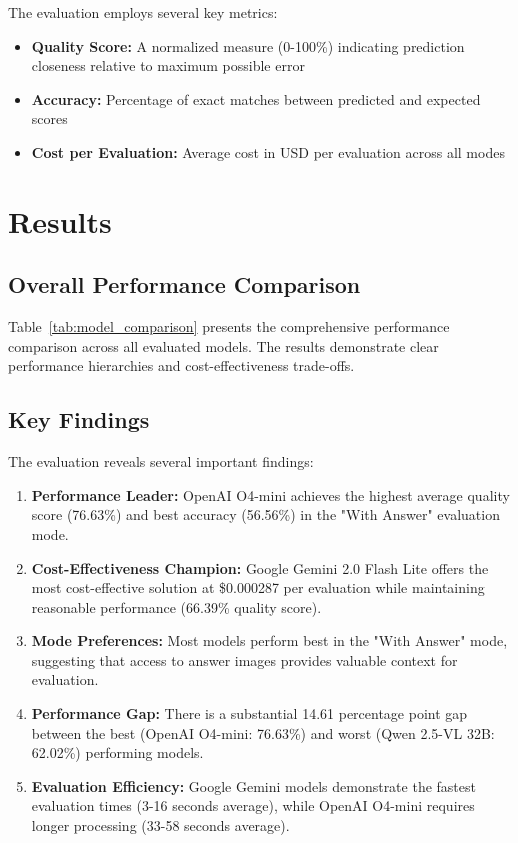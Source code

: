 \documentclass[11pt]{article}
\begin{document}
The evaluation employs several key metrics:

\begin{itemize}
\item \textbf{Quality Score:} A normalized measure (0-100\%) indicating prediction closeness relative to maximum possible error
\item \textbf{Accuracy:} Percentage of exact matches between predicted and expected scores
\item \textbf{Cost per Evaluation:} Average cost in USD per evaluation across all modes
\end{itemize}

\section{Results}

\subsection{Overall Performance Comparison}

Table~\ref{tab:model_comparison} presents the comprehensive performance comparison across all evaluated models. The results demonstrate clear performance hierarchies and cost-effectiveness trade-offs.



\subsection{Key Findings}

The evaluation reveals several important findings:

\begin{enumerate}
\item \textbf{Performance Leader:} OpenAI O4-mini achieves the highest average quality score (76.63\%) and best accuracy (56.56\%) in the "With Answer" evaluation mode.

\item \textbf{Cost-Effectiveness Champion:} Google Gemini 2.0 Flash Lite offers the most cost-effective solution at \$0.000287 per evaluation while maintaining reasonable performance (66.39\% quality score).

\item \textbf{Mode Preferences:} Most models perform best in the "With Answer" mode, suggesting that access to answer images provides valuable context for evaluation.

\item \textbf{Performance Gap:} There is a substantial 14.61 percentage point gap between the best (OpenAI O4-mini: 76.63\%) and worst (Qwen 2.5-VL 32B: 62.02\%) performing models.

\item \textbf{Evaluation Efficiency:} Google Gemini models demonstrate the fastest evaluation times (3-16 seconds average), while OpenAI O4-mini requires longer processing (33-58 seconds average).
\end{enumerate}
\end{document}
